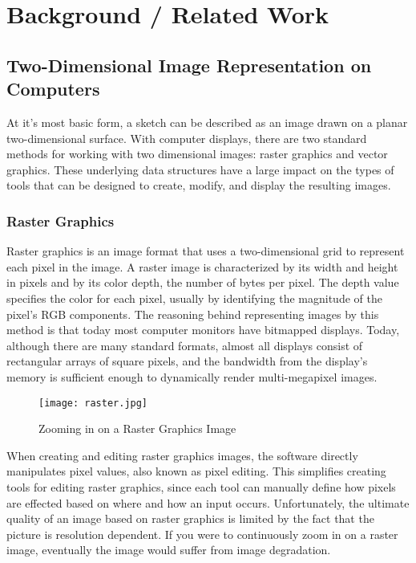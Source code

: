 \chapter{Background / Related Work}

\section{Two-Dimensional Image Representation on Computers}
\label{sec:2dimages}

At it's most basic form, a sketch can be described as an image drawn on a planar two-dimensional surface.
With computer displays, there are two standard methods for working with two dimensional images: raster graphics and vector graphics.
These underlying data structures have a large impact on the types of tools that can be designed to create, modify, and display the resulting images.

\subsection{Raster Graphics}

Raster graphics is an image format that uses a two-dimensional grid to represent each pixel in the image. 
A raster image is characterized by its width and height in pixels and by its color depth, the number of bytes per pixel. 
The depth value specifies the color for each pixel, usually by identifying the magnitude of the pixel's RGB components. 
The reasoning behind representing images by this method is that today most computer monitors have bitmapped displays. 
Today, although there are many standard formats, almost all displays consist of rectangular arrays of square pixels, and the bandwidth from the display's memory is sufficient enough to dynamically render multi-megapixel images. 
\begin{figure}
\texttt{[image: raster.jpg]}
\caption{Zooming in on a Raster Graphics Image \autocite{printingcollection}}
\end{figure}



When creating and editing raster graphics images, the software directly manipulates pixel values, also known as pixel editing.
This simplifies creating tools for editing raster graphics, since each tool can manually define how pixels are effected based on where and how an input occurs. 
Unfortunately, the ultimate quality of an image based on raster graphics is limited by the fact that the picture is resolution dependent. 
If you were to continuously zoom in on a raster image, eventually the image would suffer from image degradation. 

